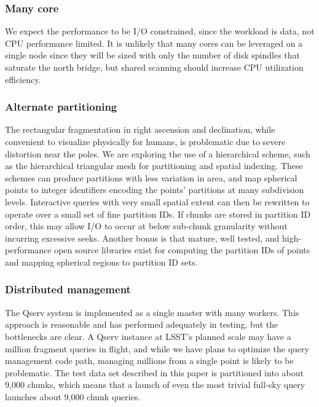 \documentclass[DM,toc]{lsstdoc}
\begin{document}
\subsubsection{Many core}\label{many-core}

We expect the performance to be I/O constrained, since the workload is
data, not CPU performance limited. It is unlikely that many cores can be
leveraged on a single node since they will be sized with only the number
of disk spindles that saturate the north bridge, but shared scanning
should increase CPU utilization efficiency.

\subsubsection{Alternate partitioning}\label{alternate-partitioning}

The rectangular fragmentation in right ascension and declination, while
convenient to visualize physically for humans, is problematic due to
severe distortion near the poles. We are exploring the use of a
hierarchical scheme, such as the hierarchical triangular mesh
\citep{2001misk.conf..631K} for partitioning and spatial indexing. These schemes can
produce partitions with less variation in area, and map spherical points
to integer identifiers encoding the points' partitions at many
subdivision levels. Interactive queries with very small spatial extent
can then be rewritten to operate over a small set of fine partition IDs.
If chunks are stored in partition ID order, this may allow I/O to occur
at below sub-chunk granularity without incurring excessive seeks.
Another bonus is that mature, well tested, and high-performance open
source libraries exist for computing the partition IDs of points and
mapping spherical regions to partition ID sets.

\subsubsection{Distributed management}\label{distributed-management}

The Qserv system is implemented as a single master with many workers.
This approach is reasonable and has performed adequately in testing, but
the bottlenecks are clear. A Qserv instance at LSST's planned scale may
have a million fragment queries in flight, and while we have plans to
optimize the query management code path, managing millions from a single
point is likely to be problematic. The test data set described in this
paper is partitioned into about 9,000 chunks, which means that a launch
of even the most trivial full-sky query launches about 9,000 chunk
queries.
\end{document}

